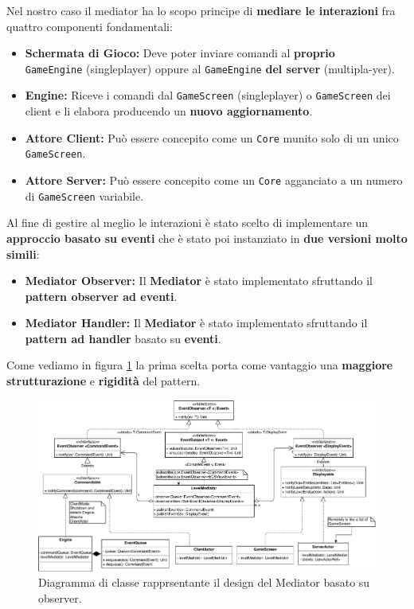 Nel nostro caso il mediator ha lo scopo principe di \textbf{mediare le interazioni} fra quattro componenti fondamentali:
\begin{itemize}
	\item{\textbf{Schermata di Gioco:}}
	Deve poter inviare comandi al \textbf{proprio} \\ \texttt{GameEngine} (singleplayer) oppure al \texttt{GameEngine} \textbf{del server} (multipla-yer). 
	\item{\textbf{Engine:}}
	Riceve i comandi dal \texttt{GameScreen} (singleplayer) o \texttt{GameScreen} dei client e li elabora producendo un \textbf{nuovo aggiornamento}. 
	\item{\textbf{Attore Client:}}
	Può essere concepito come un \texttt{Core} munito solo di un unico \texttt{GameScreen}.
	\item{\textbf{Attore Server:}}
	Può essere concepito come un \texttt{Core} agganciato a un numero di \texttt{GameScreen} variabile.
\end{itemize}
Al fine di gestire al meglio le interazioni è stato scelto di implementare un \textbf{approccio basato su eventi} che è stato poi instanziato in \textbf{due versioni molto simili}:
\begin{itemize}
	\item{\textbf{Mediator Observer:}}
	Il \textbf{Mediator} è stato implementato sfruttando il \textbf{pattern observer ad eventi}.
	\item{\textbf{Mediator Handler:}}
	Il \textbf{Mediator} è stato implementato sfruttando il \textbf{pattern ad handler} basato su \textbf{eventi}.
\end{itemize}

Come vediamo in figura \ref{fig:mediatorObserver} la prima scelta porta come vantaggio una \textbf{maggiore strutturazione} e \textbf{rigidità} del pattern.

\begin{figure}[H]
	\centering
	\includegraphics[width=0.99\columnwidth]{drawio/mediator/mediatorObserver.pdf}
	\caption{Diagramma di classe rapprsentante il design del Mediator basato su observer.}
	\label{fig:mediatorObserver}
\end{figure}

